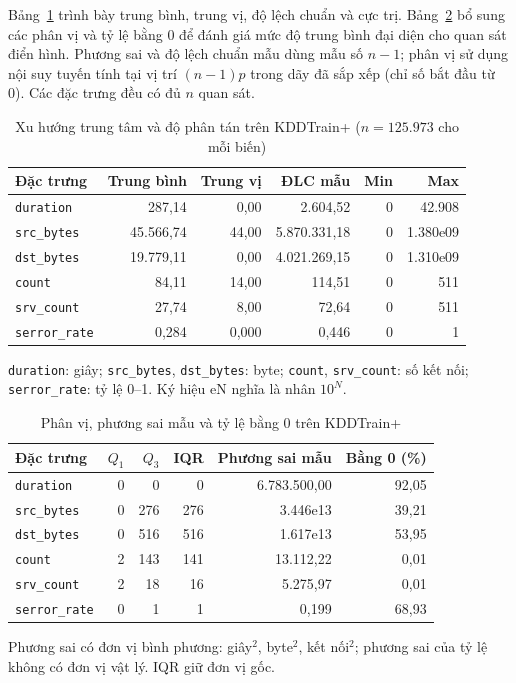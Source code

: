 Bảng~\ref{tab:t2:descriptive} trình bày trung bình, trung vị, độ lệch chuẩn và cực trị. Bảng~\ref{tab:t2:quantiles} bổ sung các phân vị và tỷ lệ bằng 0 để đánh giá mức độ trung bình đại diện cho quan sát điển hình. Phương sai và độ lệch chuẩn mẫu dùng mẫu số $n-1$; phân vị sử dụng nội suy tuyến tính tại vị trí $(n-1)p$ trong dãy đã sắp xếp (chỉ số bắt đầu từ 0). Các đặc trưng đều có đủ $n$ quan sát.
\begin{table}[H]
\centering
\caption{Xu hướng trung tâm và độ phân tán trên KDDTrain+ ($n=125.973$ cho mỗi biến)}
\label{tab:t2:descriptive}
\small
\setlength{\tabcolsep}{3pt}
\begin{tabular}{lrrrrr}
\toprule
Đặc trưng & Trung bình & Trung vị & ĐLC mẫu & Min & Max \\
\midrule
\texttt{duration} & 287,14 & 0,00 & 2.604,52 & 0 & 42.908 \\
\texttt{src\_bytes} & 45.566,74 & 44,00 & 5.870.331,18 & 0 & 1.380e09 \\
\texttt{dst\_bytes} & 19.779,11 & 0,00 & 4.021.269,15 & 0 & 1.310e09 \\
\texttt{count} & 84,11 & 14,00 & 114,51 & 0 & 511 \\
\texttt{srv\_count} & 27,74 & 8,00 & 72,64 & 0 & 511 \\
\texttt{serror\_rate} & 0,284 & 0,000 & 0,446 & 0 & 1 \\
\bottomrule
\end{tabular}
\par\smallskip\footnotesize \texttt{duration}: giây; \texttt{src\_bytes}, \texttt{dst\_bytes}: byte; \texttt{count}, \texttt{srv\_count}: số kết nối; \texttt{serror\_rate}: tỷ lệ 0--1. Ký hiệu eN nghĩa là nhân $10^N$.
\end{table}\begin{table}[H]
\centering
\caption{Phân vị, phương sai mẫu và tỷ lệ bằng 0 trên KDDTrain+}
\label{tab:t2:quantiles}
\small
\setlength{\tabcolsep}{3pt}
\begin{tabular}{lrrrrr}
\toprule
Đặc trưng & $Q_1$ & $Q_3$ & IQR & Phương sai mẫu & Bằng 0 (\%) \\
\midrule
\texttt{duration} & 0 & 0 & 0 & 6.783.500,00 & 92,05 \\
\texttt{src\_bytes} & 0 & 276 & 276 & 3.446e13 & 39,21 \\
\texttt{dst\_bytes} & 0 & 516 & 516 & 1.617e13 & 53,95 \\
\texttt{count} & 2 & 143 & 141 & 13.112,22 & 0,01 \\
\texttt{srv\_count} & 2 & 18 & 16 & 5.275,97 & 0,01 \\
\texttt{serror\_rate} & 0 & 1 & 1 & 0,199 & 68,93 \\
\bottomrule
\end{tabular}
\par\smallskip\footnotesize Phương sai có đơn vị bình phương: giây$^2$, byte$^2$, kết nối$^2$; phương sai của tỷ lệ không có đơn vị vật lý. IQR giữ đơn vị gốc.
\end{table}
